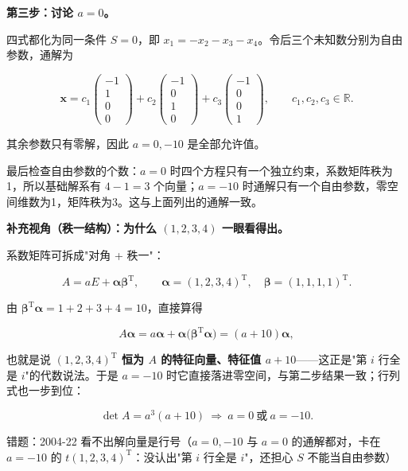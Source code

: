 \documentclass[UTF8,11pt,fontset=windows]{ctexart}
\begin{document}
\textbf{第三步：讨论 $a=0$。}

四式都化为同一条件 $S=0$，即 $x_1=-x_2-x_3-x_4$。令后三个未知数分别为自由参数，通解为

$$
\boldsymbol x=c_1\begin{pmatrix}-1\\1\\0\\0\end{pmatrix}
+c_2\begin{pmatrix}-1\\0\\1\\0\end{pmatrix}
+c_3\begin{pmatrix}-1\\0\\0\\1\end{pmatrix},
\qquad c_1,c_2,c_3\in\mathbb R.
$$

其余参数只有零解，因此 $a=0,-10$ 是全部允许值。

最后检查自由参数的个数：$a=0$ 时四个方程只有一个独立约束，系数矩阵秩为1，所以基础解系有 $4-1=3$ 个向量；$a=-10$ 时通解只有一个自由参数，零空间维数为1，矩阵秩为3。这与上面列出的通解一致。

\textbf{补充视角（秩一结构）：为什么 $(1,2,3,4)$ 一眼看得出。}

系数矩阵可拆成"对角 + 秩一"：

$$
A=aE+\boldsymbol\alpha\boldsymbol\beta^{\mathrm T},\qquad
\boldsymbol\alpha=(1,2,3,4)^{\mathrm T},\quad
\boldsymbol\beta=(1,1,1,1)^{\mathrm T}.
$$

由 $\boldsymbol\beta^{\mathrm T}\boldsymbol\alpha=1+2+3+4=10$，直接算得

$$
A\boldsymbol\alpha
=a\boldsymbol\alpha+\boldsymbol\alpha\bigl(\boldsymbol\beta^{\mathrm T}\boldsymbol\alpha\bigr)
=(a+10)\boldsymbol\alpha,
$$

也就是说 \textbf{$(1,2,3,4)^{\mathrm T}$ 恒为 $A$ 的特征向量、特征值 $a+10$}——这正是"第 $i$ 行全是 $i$"的代数说法。于是 $a=-10$ 时它直接落进零空间，与第二步结果一致；行列式也一步到位：

$$
\det A=a^{3}(a+10)\ \Longrightarrow\ a=0\ \text{或}\ a=-10 .
$$

\begingroup\color{gray}错题：2004-22 看不出解向量是行号（$a=0,-10$ 与 $a=0$ 的通解都对，卡在 $a=-10$ 的 $t(1,2,3,4)^{\mathrm T}$：没认出"第 $i$ 行全是 $i$"，还担心 $S$ 不能当自由参数）\par\endgroup
\end{document}
